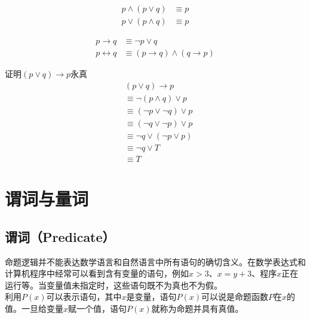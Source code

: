 \documentclass[12pt, openany, oneside]{book}
\begin{document}
\begin{tcolorbox}
	\begin{align}
		p \wedge (p \vee q) & \equiv p \\
		p \vee (p \wedge q) & \equiv p
	\end{align}
\end{tcolorbox}

\begin{tcolorbox}
	\begin{align}
		p \rightarrow q     & \equiv \neg p \vee q                              \\
		p \leftrightarrow q & \equiv (p \rightarrow q) \wedge (q \rightarrow p)
	\end{align}
\end{tcolorbox}

\begin{tcolorbox}
	证明$ (p \vee q) \rightarrow p $永真
	\begin{align*}
		 & (p \vee q) \rightarrow p           \\
		 & \equiv \neg (p \wedge q) \vee p    \\
		 & \equiv (\neg p \vee \neg q) \vee p \\
		 & \equiv (\neg q \vee \neg p) \vee p \\
		 & \equiv \neg q \vee (\neg p \vee p) \\
		 & \equiv \neg q \vee T               \\
		 & \equiv T
	\end{align*}
\end{tcolorbox}

\newpage

\section{谓词与量词}

\subsection{谓词（Predicate）}

命题逻辑并不能表达数学语言和自然语言中所有语句的确切含义。在数学表达式和计算机程序中经常可以看到含有变量的语句，例如$ x > 3 $、$ x = y + 3 $、程序$ x $正在运行等。当变量值未指定时，这些语句既不为真也不为假。\\

利用$ P(x) $可以表示语句，其中$ x $是变量，语句$ P(x) $可以说是命题函数$ P $在$ x $的值。一旦给变量$ x $赋一个值，语句$ P(x) $就称为命题并具有真值。\\
\end{document}
